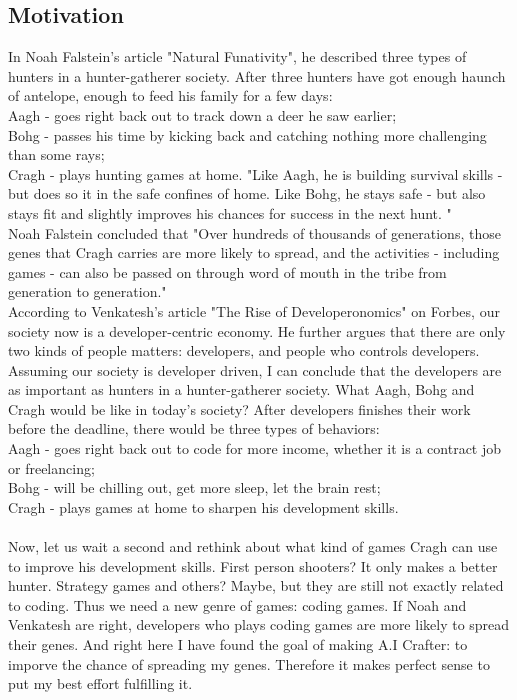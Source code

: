 \documentclass[12pt]{article}
\begin{document}
\subsection{Motivation}
In Noah Falstein's article "Natural Funativity"\cite{noah2004}, he described three types of hunters in a hunter-gatherer society. After three hunters have got enough haunch of antelope, enough to feed his family for a few days:\\
Aagh - goes right back out to track down a deer he saw earlier;\\
Bohg - passes his time by kicking back and catching nothing more challenging than some rays;\\
Cragh - plays hunting games at home. "Like Aagh, he is building survival skills - but does so it in the safe confines of home. Like Bohg, he stays safe - but also stays fit and slightly improves his chances for success in the next hunt. "\\
Noah Falstein concluded that "Over hundreds of thousands of generations, those genes that Cragh carries are more likely to spread, and the activities - including games - can also be passed on through word of mouth in the tribe from generation to generation."\\

According to Venkatesh's article "The Rise of Developeronomics"\cite{venkatesh2011} on Forbes, our society now is a developer-centric economy. He further argues that there are only two kinds of people matters: developers, and people who controls developers. Assuming our society is developer driven, I can conclude that the developers are as important as hunters in a hunter-gatherer society. What Aagh, Bohg and Cragh would be like in today's society? After developers finishes their work before the deadline, there would be three types of behaviors:\\
Aagh - goes right back out to code for more income, whether it is a contract job or freelancing;\\
Bohg - will be chilling out, get more sleep, let the brain rest;\\
Cragh - plays games at home to sharpen his development skills.\\ 
\\
Now, let us wait a second and rethink about what kind of games Cragh can use to improve his development skills. First person shooters? It only makes a better hunter. Strategy games and others? Maybe, but they are still not exactly related to coding. Thus we need a new genre of games: coding games. If Noah and Venkatesh are right, developers who plays coding games are more likely to spread their genes. And right here I have found the goal of making A.I Crafter: to imporve the chance of spreading my genes. Therefore it makes perfect sense to put my best effort fulfilling it.
\end{document}

